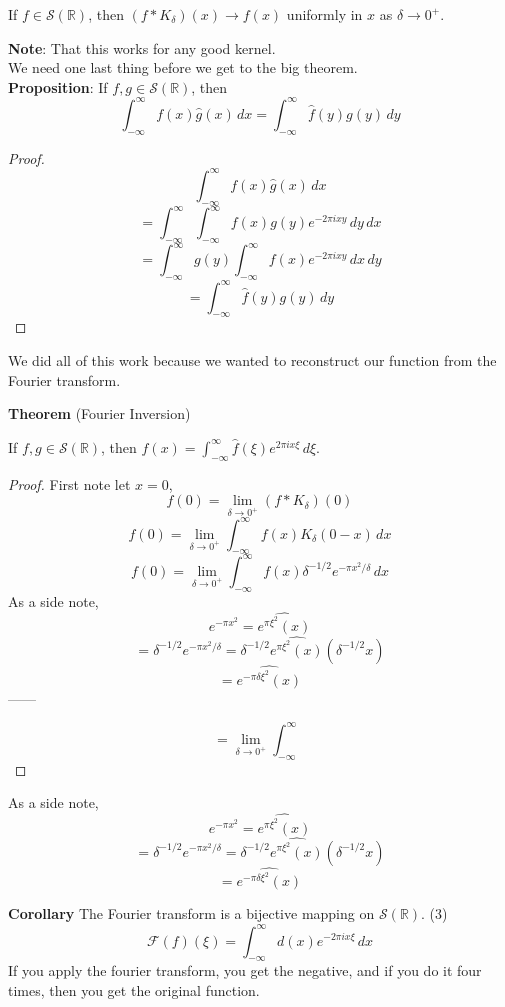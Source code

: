 \documentclass[12pt]{article}
\begin{document}
\noindent If $f \in \mathcal{S}(\mathbb{R})$, then $(f * K_\delta)(x) \rightarrow f(x)$ uniformly in $x$ as $\delta \rightarrow 0^+$. 

\textbf{Note}: That this works for any good kernel. \\

\noindent We need one last thing before we get to the big theorem. \\

\noindent \textbf{Proposition}: If $f,g \in \mathcal{S}(\mathbb{R})$, then 
$$\int^{\infty}_{-\infty}f(x)\hat{g}(x) \,dx = \int^{\infty}_{-\infty}\hat{f}(y)g(y) \,dy$$
\begin{proof}
$$\int^{\infty}_{-\infty}f(x)\hat{g}(x) \,dx $$
$$= \int^{\infty}_{-\infty}\int^{\infty}_{-\infty}f(x)g(y)e^{-2\pi ixy} \,dy \,dx$$
$$= \int^{\infty}_{-\infty} g(y)\int^{\infty}_{-\infty}f(x)e^{-2\pi ixy} \,dx \,dy $$
$$ = \int^{\infty}_{-\infty}\hat{f}(y)g(y) \,dy$$
\end{proof}

We did all of this work because we wanted to reconstruct our function from the Fourier transform. 

\noindent \textbf{Theorem} (Fourier Inversion)

\noindent If $f,g \in \mathcal{S}(\mathbb{R})$, then $f(x) = \int^\infty_{-\infty} \hat{f}(\xi)e^{2\pi i x \xi } \, d \xi$.

\begin{proof}
First note  let $x =0$,
$$f(0)= \lim_{\delta \rightarrow 0^+} (f*K_\delta)(0)$$
$$f(0)= \lim_{\delta \rightarrow 0^+} \int^\infty_{-\infty} f(x) K_\delta(0-x)\, dx$$
$$f(0)= \lim_{\delta \rightarrow 0^+} \int^\infty_{-\infty} f(x) \delta^{-1/2}e^{-\pi x^2/\delta} \,dx$$
As a side note, 
$$e^{-\pi x^2} = \widehat{e^{\pi \xi^2}(x)}$$
$$= \delta^{-1/2} e^{-\pi x^2/ \delta} = \delta^{-1/2} \widehat{e^{\pi \xi^2}(x)} (\delta^{-1/2}x)$$
$$= \widehat{e^{-\pi \delta \xi^2}(x)}$$
------



$$ = \lim_{\delta \rightarrow 0^+} \int^{\infty}_{-\infty}$$

\end{proof}
As a side note, 
$$e^{-\pi x^2} = \widehat{e^{\pi \xi^2}(x)}$$
$$= \delta^{-1/2} e^{-\pi x^2/ \delta} = \delta^{-1/2} \widehat{e^{\pi \xi^2}(x)} (\delta^{-1/2}x)$$
$$= \widehat{e^{-\pi \delta \xi^2}(x)}$$




\noindent \textbf{Corollary} The Fourier transform is a bijective mapping on  $\mathcal{S}(\mathbb{R})$. (3) \\
$$\mathcal{F}(f)(\xi) = \int^{\infty}_{-\infty}d(x) e^{-2\pi i x \xi} \, dx $$
If you apply the fourier transform, you get the negative, and if you do it four times, then you get the original function. \\
\end{document}
